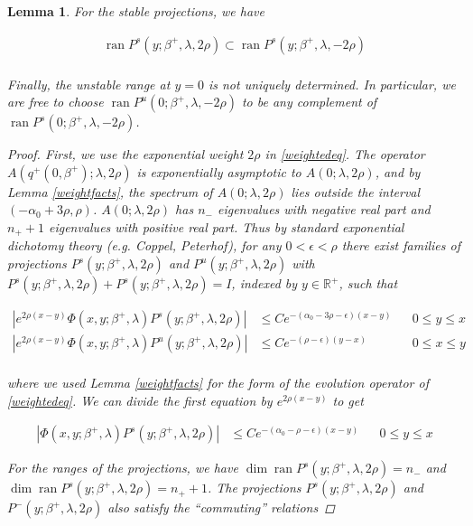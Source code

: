 \documentclass[12pt]{article}
\def\R{{\mathbb R}}
\DeclareMathOperator{\ran}{ran}
\newtheorem{lemma}{Lemma}
\begin{document}
\begin{lemma}
For the stable projections, we have

\begin{align*}
\ran P^s(y; \beta^+, \lambda, 2 \rho) \subset \ran P^s(y; \beta^+, \lambda, -2 \rho) \\
\end{align*}

Finally, the unstable range at $y = 0$ is not uniquely determined. In particular, we are free to choose $\ran P^u(0; \beta^+, \lambda, -2 \rho)$ to be any complement of $\ran P^s(0; \beta^+, \lambda, -2 \rho)$.

\begin{proof}

First, we use the exponential weight $2 \rho$ in \eqref{weightedeq}. The operator $A(q^+(0, \beta^+); \lambda, 2 \rho)$ is exponentially asymptotic to $A(0; \lambda, 2 \rho)$, and by Lemma \ref{weightfacts}, the spectrum of $A(0; \lambda, 2 \rho)$ lies outside the interval $(-\alpha_0 + 3 \rho, \rho)$. $A(0; \lambda, 2 \rho)$ has $n_-$ eigenvalues with negative real part and $n_+ + 1$ eigenvalues with positive real part. Thus by standard exponential dichotomy theory (e.g. Coppel, Peterhof), for any $0 < \epsilon < \rho$ there exist families of projections $P^s(y; \beta^+, \lambda, 2 \rho)$ and $P^u(y; \beta^+, \lambda, 2 \rho)$ with $P^s(y; \beta^+, \lambda, 2 \rho) + P^s(y; \beta^+, \lambda, 2 \rho) = I$, indexed by $y \in \R^+$, such that

\begin{align*}
|e^{2 \rho (x - y)} \Phi(x, y; \beta^+, \lambda)P^s(y; \beta^+, \lambda, 2 \rho)| &\leq C e^{-(\alpha_0 - 3 \rho - \epsilon)(x - y)} && 0 \leq y \leq x \\
|e^{2 \rho (x - y)} \Phi(x, y; \beta^+, \lambda)P^u(y; \beta^+, \lambda, 2 \rho)| &\leq C e^{-(\rho - \epsilon)(y - x)} && 0 \leq x \leq y \\
\end{align*}

where we used Lemma \ref{weightfacts} for the form of the evolution operator of \eqref{weightedeq}. We can divide the first equation by $e^{2 \rho (x - y)}$ to get

\begin{align}\label{Ps2rhobound}
|\Phi(x, y; \beta^+, \lambda)P^s(y; \beta^+, \lambda, 2 \rho)| &\leq C e^{-(\alpha_0 - \rho - \epsilon)(x - y)} && 0 \leq y \leq x
\end{align}

For the ranges of the projections, we have $\dim \ran P^s(y; \beta^+, \lambda, 2 \rho) = n_-$ and $\dim \ran P^s(y; \beta^+, \lambda, 2 \rho) = n_+ + 1$. The projections $P^s(y; \beta^+, \lambda, 2 \rho)$ and $P^-(y; \beta^+, \lambda, 2 \rho)$ also satisfy the ``commuting'' relations


\end{proof}
\end{lemma}
\end{document}
